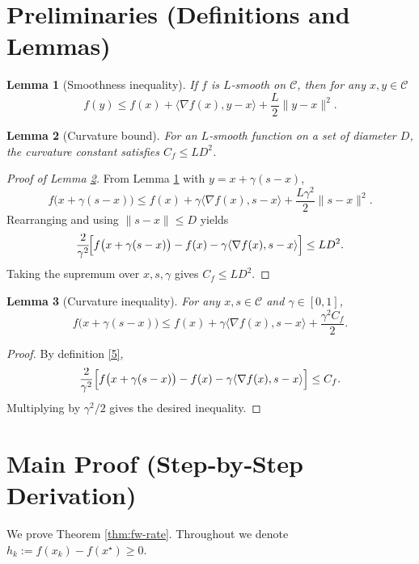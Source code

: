\documentclass{article}
\newtheorem{lemma}{Lemma}
\newcommand{\Cset}{\mathcal{C}}
\newcommand{\opt}{x^{\star}}
\newcommand{\grad}{\nabla}
\newcommand{\inner}[2]{\langle #1,#2\rangle}
\newcommand{\norm}[1]{\|#1\|}
\begin{document}
\section*{Preliminaries (Definitions and Lemmas)}
\begin{lemma}[Smoothness inequality]\label{lem:smooth}
If $f$ is $L$‑smooth on $\Cset$, then for any $x,y\in\Cset$
\[
f(y)\le f(x)+\inner{\grad f(x)}{y-x}+\frac{L}{2}\norm{y-x}^{2}.
\tag{L1}
\]
\end{lemma}
\begin{lemma}[Curvature bound]\label{lem:curv}
For an $L$‑smooth function on a set of diameter $D$, the curvature constant satisfies $C_{f}\le L D^{2}$.
\end{lemma}
\begin{proof}[Proof of Lemma \ref{lem:curv}]
From Lemma \ref{lem:smooth} with $y=x+\gamma(s-x)$,
\[
f\bigl(x+\gamma(s-x)\bigr)\le f(x)+\gamma\inner{\grad f(x)}{s-x}+\frac{L\gamma^{2}}{2}\norm{s-x}^{2}.
\]
Rearranging and using $\norm{s-x}\le D$ yields
\[
\frac{2}{\gamma^{2}}\!\Bigl[f\bigl(x+\gamma(s-x)\bigr)-f(x)-\gamma\inner{\grad f(x)}{s-x}\Bigr]
\le L D^{2}.
\]
Taking the supremum over $x,s,\gamma$ gives $C_{f}\le L D^{2}$.
\end{proof}

\begin{lemma}[Curvature inequality]\label{lem:curvature-ineq}
For any $x,s\in\Cset$ and $\gamma\in[0,1]$,
\[
f\bigl(x+\gamma(s-x)\bigr)\le f(x)+\gamma\inner{\grad f(x)}{s-x}+\frac{\gamma^{2}C_{f}}{2}.
\tag{L3}
\]
\end{lemma}
\begin{proof}
By definition \eqref{5},
\[
\frac{2}{\gamma^{2}}\Bigl[f\bigl(x+\gamma(s-x)\bigr)-f(x)-\gamma\inner{\grad f(x)}{s-x}\Bigr]\le C_{f}.
\]
Multiplying by $\gamma^{2}/2$ gives the desired inequality.
\end{proof}

\section*{Main Proof (Step‑by‑Step Derivation)}
We prove Theorem \ref{thm:fw-rate}.  Throughout we denote $h_{k}:=f(x_{k})-f(\opt)\ge0$.
\end{document}
